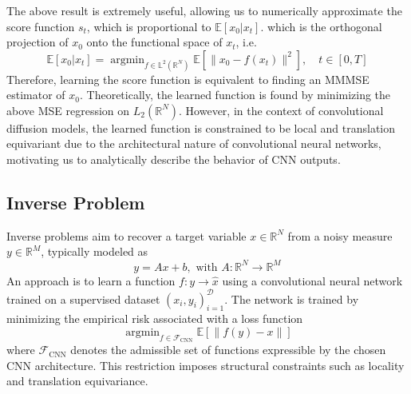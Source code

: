 \documentclass[a4paper,10pt]{article}
\theoremstyle{definition} %
\theoremstyle{definition} %
\theoremstyle{definition} %
\theoremstyle{definition} %
\DeclareMathOperator*{\argmin}{argmin}
\newcommand{\R}{\mathbb{R}}
\newcommand{\E}[1]{\mathbb{E} \left[ {#1} \right] }
\newcommand{\norm}[1]{\left\| #1 \right \|}
\newcommand{\0}{\boldsymbol{0}}
\begin{document}
The above result is extremely useful, allowing us to numerically approximate the score function $s_t$, which is proportional to $\mathbb{E}[x_0 | x_t]$. which is the orthogonal projection of $x_0$ onto the functional space of $x_t$, i.e. 
\[
\mathbb{E}[x_0 | x_t] = \argmin_{f \in \mathbb{L}^2(\mathbb{R}^N)} \mathbb{E}\left[ \| x_0 - f(x_t) \|^2 \right], \quad t \in [0,T]
\]
Therefore, learning the score function is equivalent to finding an MMMSE estimator of $x_0$. Theoretically, the learned function is found by minimizing the above MSE regression on $L_2(\R^N)$. However, in the context of convolutional diffusion models, the learned function is constrained to be local and translation equivariant due to the architectural nature of convolutional neural networks, motivating us to analytically describe the behavior of CNN outputs.


\subsection{Inverse Problem}
Inverse problems aim to recover a target variable $x \in \R^N$ from a noisy measure $y \in \R^M$, typically modeled as
\begin{equation*}
    y = Ax +b, \text{ with } A:\R^N \rightarrow \R^M
\end{equation*}
An approach is to learn a function $f : y \rightarrow \hat{x}$ using a convolutional neural network trained on a supervised dataset ${(x_i,y_i)}_{i=1}^\mathcal{D}$. The network is trained by minimizing the empirical risk associated with a loss function
\begin{equation*}
    \argmin_{f\in \mathcal{F}_{\text{CNN}}} \E{\norm{f(y)-x}}
\end{equation*}
where $\mathcal{F}_{\text{CNN}}$ denotes the admissible set of functions expressible by the chosen CNN architecture. This restriction imposes structural constraints such as locality and translation equivariance.
\end{document}
